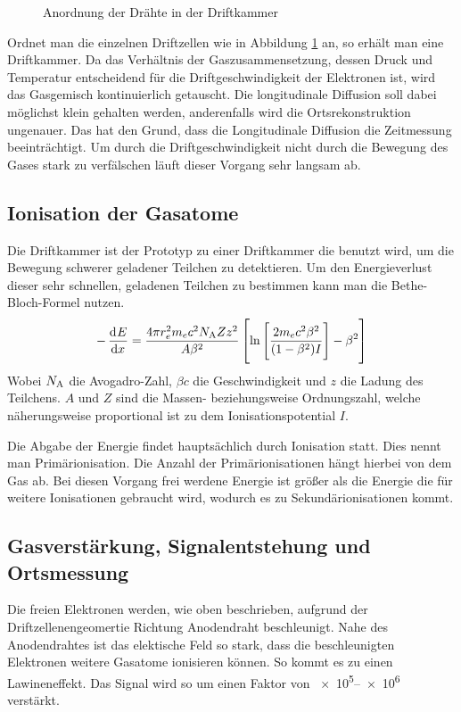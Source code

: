 \documentclass[11pt, ngerman, fleqn, DIV=15, headinclude, BCOR=2cm]{scrreprt}
\begin{document}
\begin{figure}
	\centering
	\caption{%
		Anordnung der Drähte in der Driftkammer
	}
	\label{fig:aufbau_driftkammer}
\end{figure}

Ordnet man die einzelnen Driftzellen wie in Abbildung
\ref{fig:aufbau_driftkammer} an, so erhält man eine Driftkammer.
Da das Verhältnis der Gaszusammensetzung, dessen Druck und Temperatur
entscheidend für die Driftgeschwindigkeit der Elektronen ist, wird das Gasgemisch kontinuierlich getauscht. 
Die longitudinale Diffusion soll dabei möglichst klein gehalten werden,
anderenfalls wird die Ortsrekonstruktion ungenauer.
Das hat den Grund, dass die Longitudinale Diffusion die Zeitmessung beeinträchtigt.
Um durch die Driftgeschwindigkeit nicht durch die Bewegung des Gases stark zu verfälschen läuft dieser Vorgang sehr langsam ab.

\subsection{Ionisation der Gasatome}
Die Driftkammer ist der Prototyp zu einer Driftkammer die benutzt wird, um
die Bewegung schwerer geladener Teilchen zu detektieren.
Um den Energieverlust dieser sehr schnellen, geladenen Teilchen zu bestimmen kann man die Bethe-Bloch-Formel nutzen.
\[
    -\dod Ex = \frac{4 \pi r^2_e m_e c^2 N_\text{A} Z z^2}{A \beta^2}\sbr{\ln\sbr{\frac{2m_e c^2 \beta^2}{(1-\beta^2)I}}-\beta^2}
\]
Wobei $N_\text A$ die Avogadro-Zahl, $\beta c$ die Geschwindigkeit und $z$ die Ladung des Teilchens. $A$ und $Z$ sind die Massen- beziehungsweise Ordnungszahl, welche näherungsweise proportional ist zu dem Ionisationspotential $I$.

Die Abgabe der Energie findet hauptsächlich durch Ionisation statt.
Dies nennt man Primärionisation.
Die Anzahl der Primärionisationen hängt hierbei von dem Gas ab.
Bei diesen Vorgang frei werdene Energie ist größer als die Energie die für weitere Ionisationen gebraucht wird, wodurch es zu Sekundärionisationen kommt.

\subsection{Gasverstärkung, Signalentstehung und Ortsmessung}
Die freien Elektronen werden, wie oben beschrieben, aufgrund der Driftzellenengeomertie Richtung Anodendraht beschleunigt. 
Nahe des Anodendrahtes ist das elektische Feld so stark, dass die beschleunigten Elektronen weitere Gasatome ionisieren können.
So kommt es zu einen Lawineneffekt.
Das Signal wird so um einen Faktor von \numrange{e5}{e6} verstärkt.
\end{document}
